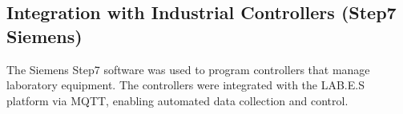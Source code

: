 \subsection{Integration with Industrial Controllers (Step7 Siemens)}
The Siemens Step7 software was used to program controllers that manage laboratory equipment. The controllers were integrated with the LAB.E.S platform via MQTT, enabling automated data collection and control.
